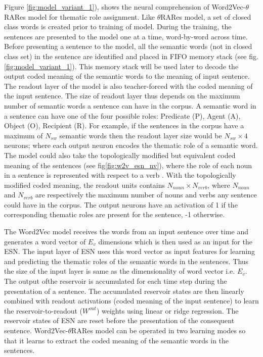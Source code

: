 Figure \ref{fig:model_variant_1}), shows the neural comprehension of Word2Vec-$\theta$RARes model for thematic role assignment. Like $\theta$RARes model, a set of closed class words is created prior to training of model. During the training, the sentences are presented to the model one at a time, word-by-word across time. Before presenting a sentence to the model, all the semantic words (not in closed class set) in the sentence are identified and placed in FIFO memory stack (see fig. \ref{fig:model_variant_1}). This memory stack will be used later to decode the output coded meaning of the semantic words to the meaning of input sentence. The readout layer of the model is also teacher-forced with the coded meaning of the input sentence. The size of readout layer thus depends on the maximum number of semantic words a sentence can have in the corpus. A semantic word in a sentence can have one of the four possible roles: Predicate (P), Agent (A), Object (O), Recipient (R). For example, if the sentences in the corpus have a maximum of $N_{sw}$ semantic words then the readout layer size would be $N_{sw} \times 4 $ neurons; where each output neuron encodes the thematic role of a semantic word. The model could also take the topologically modified but equivalent coded meaning of the sentences (see fig\ref{fig:w2v_esn_nv}), where the role of each noun in a sentence is represented with respect to a verb \cite{xavier:2013:RT}. With the topologically modified coded meaning, the readout units contains $N_{noun} \times N_{verb}$, where $N_{noun}$ and $N_{verb}$ are respectively the maximum number of nouns and verbs any sentence could have in the corpus. The output neurons have an activation of 1 if the corresponding thematic roles are present for the sentence, -1 otherwise. 

The Word2Vec model receives the words from an input sentence over time and generates a word vector of $E_{v}$ dimensions which is then used as an input for the ESN. The input layer of ESN uses this word vector as input features for learning and predicting the thematic roles of the semantic words in the sentences. Thus the size of the input layer is same as the dimensionality of word vector i.e. $E_{v}$. The output ofthe reservoir is accumulated for each time step during the presentation of a sentence. The accumulated reservoir states are then linearly combined with readout activations (coded meaning of the input sentence) to learn the reservoir-to-readout ($W^{out}$) weights using linear or ridge regression. The reservoir states of ESN are reset before the presentation of the consequent sentence. Word2Vec-$\theta$RARes model can be operated in two learning modes so that it learns to extract the coded meaning of the semantic words in the sentences.

